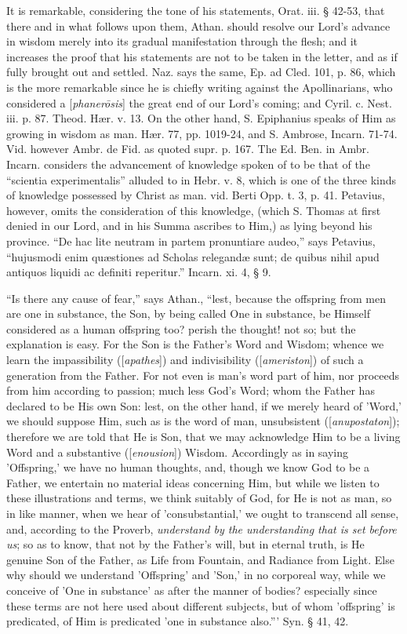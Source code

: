 It is remarkable, considering the tone of his
statements, Orat. iii. § 42-53, that there and in what follows upon
them, Athan. should resolve our Lord's advance in wisdom merely into
its gradual manifestation through the flesh; and it increases the
proof that his statements are not to be taken in the letter, and as if
fully brought out and settled. Naz. says the same, Ep. ad Cled. 101,
p. 86, which is the more remarkable since he is chiefly writing
against the Apollinarians, who considered a [\emph{phaner\={o}sis}]
the great end of our Lord's coming; and Cyril. c. Nest. iii. p. 87.
Theod. Hær. v. 13. On the other hand, S. Epiphanius speaks of Him as
growing in wisdom as man. Hær. 77, pp. 1019-24, and S. Ambrose,
Incarn. 71-74. Vid.
however Ambr. de Fid. as quoted supr. p. 167. The Ed. Ben. in Ambr.
Incarn. considers the advancement of knowledge spoken of to be that of
the ``scientia experimentalis'' alluded to in Hebr. v. 8, which is
one of the three kinds of knowledge possessed by Christ as man.
vid. Berti Opp. t. 3, p. 41. Petavius, however, omits the
consideration of this knowledge, (which S. Thomas at first denied in
our Lord, and in his Summa ascribes to Him,) as lying beyond his
province. ``De hac lite neutram in partem pronuntiare audeo,'' says
Petavius, ``hujusmodi enim quæstiones ad Scholas relegandæ sunt; de
quibus nihil apud antiquos liquidi ac definiti reperitur.'' Incarn. xi. 4, § 9.


``Is there any cause of fear,'' says Athan., ``lest, because the offspring from men are one in substance, the Son,
by being called One in substance, be Himself considered as a human
offspring too? perish the thought! not so; but the explanation is
easy. For the Son is the Father's Word and Wisdom; whence we learn
the impassibility ([\emph{apathes}]) and indivisibility ([\emph{ameriston}])
of such a generation from the Father. For not even is man's word
part of him, nor proceeds from him according to passion; much less
God's Word; whom the Father has declared to be His own Son: lest, on
the other hand, if we merely heard of 'Word,' we should suppose Him,
such as is the word of man, unsubsistent ([\emph{anupostaton}]);
therefore we are told that He is Son, that we may acknowledge Him to
be a living Word and a substantive ([\emph{enousion}]) Wisdom.
Accordingly as in saying 'Offspring,' we have no human thoughts, and,
though we know God to be a Father, we entertain no material ideas
concerning Him, but while we listen to these illustrations and terms,
we think suitably of God, for He is not as man, so in like manner,
when we hear of 'consubstantial,' we ought to transcend all sense,
and, according to the Proverb, \emph{understand by the understanding that
is set before us}; so as to know, that not by the Father's will,
but in eternal truth, is He genuine Son of the Father, as Life
from Fountain, and Radiance from Light. Else why should we understand
'Offspring' and 'Son,' in no corporeal way, while we conceive of 'One
in substance' as after the manner of bodies? especially since these
terms are not here used about different subjects, but of whom
'offspring' is predicated, of Him is predicated 'one in substance
also.''' Syn. § 41, 42.

